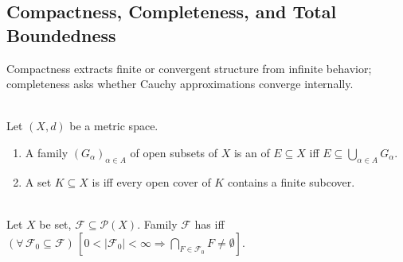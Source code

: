\subsection{Compactness, Completeness, and Total Boundedness}\label{subsec:compactness-and-completeness}

%


Compactness extracts finite or convergent structure from infinite behavior;\\
completeness asks whether Cauchy approximations converge internally.

\begin{definition} \label{def:open-cover-and-compactness} \\
Let $(X,d)$ be a metric space.
\begin{enumerate}[label=(\roman*)]
\setlength{\itemsep}{0pt}
\item A family $(G_\alpha)_{\alpha\in A}$ of open subsets of $X$ is an  of $E\subseteq X$ iff $E\subseteq\bigcup\limits_{\alpha\in A}G_\alpha$.
\item A set $K\subseteq X$ is  iff every open cover of $K$ contains a finite subcover.
\end{enumerate}
\end{definition}

\begin{definition} \label{def:finite-intersection-property} \\
Let $X$ be set, $\mathcal{F}\subseteq\mathcal{P}(X)$. Family $\mathcal{F}$ has  iff $(\forall\,\mathcal{F}_0\subseteq\mathcal{F})\,[0<|\mathcal{F}_0|<\infty\Rightarrow\bigcap\limits_{F\in\mathcal{F}_0}F\ne\emptyset]$.
\end{definition}

